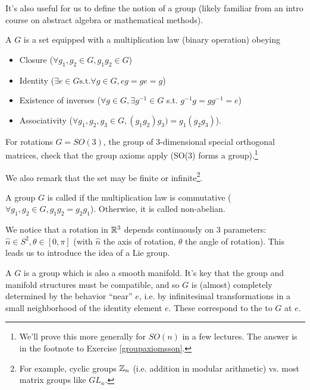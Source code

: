 It's also useful for us to define the notion of a group (likely familiar from an intro course on abstract algebra or mathematical methods).

\begin{defn}
A  $G$ is a set equipped with a multiplication law (binary operation) obeying
\begin{itemize}
    \item Closure ($\forall g_1, g_2\in G, g_1g_2 \in G$)
    \item Identity ($\exists e\in G \text{s.t.} \forall g\in G, eg = ge = g$)
    \item Existence of inverses ($\forall g \in G, \exists g^{-1} \in G$ s.t. $g^{-1}g=gg^{-1}=e$)
    \item Associativity ($\forall g_1,g_2,g_3\in G, (g_1g_2)g_3)=g_1(g_2g_3)$).
\end{itemize}
\end{defn}
\begin{ex}
 For rotations $G=SO(3)$, the group of 3-dimensional special orthogonal matrices, check that the group axioms apply (SO(3) forms a group).\footnote{We'll prove this more generally for $SO(n)$ in a few lectures. The answer is in the footnote to Exercise \ref{groupaxiomsson}.}
\end{ex}

We also remark that the set may be finite or infinite\footnote{For example, cyclic groups $\mathbb{Z}_n$ (i.e. addition in modular arithmetic) vs. most matrix groups like $GL_n$.}. 
\begin{defn}
A group $G$ is called  if the multiplication law is commutative ($\forall g_1,g_2\in G, g_1g_2=g_2g_1$). Otherwise, it is called non-abelian.
\end{defn}

We notice that a rotation in $\mathbb{R}^3$ depends continuously on 3 parameters: $\hat n\in S^2, \theta \in[0,\pi]$ (with $\hat n$ the axis of rotation, $\theta$ the angle of rotation). This leads us to introduce the idea of a Lie group.
\begin{defn}
A  $G$ is a group which is also a smooth manifold. It's key that the group and manifold structures must be compatible, and so $G$ is (almost) completely determined by the behavior ``near'' $e$, i.e. by infinitesimal transformations in a small neighborhood of the identity element $e$. These correspond to the  to $G$ at $e$.
\end{defn}

